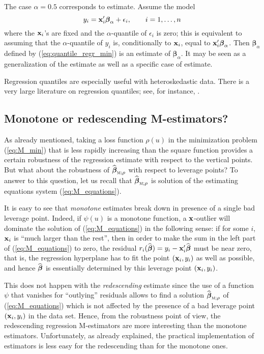 The case $\alpha=0.5$ corresponds to  estimate. Assume the model
\[
    y_{i} = \mathbf x_{i}' \boldsymbol\beta_{\alpha} + \epsilon_{i},
    \qquad i = 1, \dots, n
\]
where the $\mathbf x_{i}$'s are fixed and the $\alpha$-quantile of
$\epsilon_{i}$ is zero; this is equivalent to assuming that the
$\alpha$-quantile of $y_{i}$ is, conditionally to $\mathbf x_{i}$, equal to
$\mathbf x_{i}'\boldsymbol\beta_{\alpha}$. Then $\widehat
{\boldsymbol\beta}_{\alpha}$ defined by (\ref{eq:quantile_regr_min}) is an
estimate of $\boldsymbol\beta_{\alpha}$. It may be seen as a generalization of
the  estimate as well as a specific case of  estimate.

Regression quantiles are especially useful with heteroskedastic data. There is
a very large literature on regression quantiles; see, for instance,
\citet{Koenker:2005}.

\subsection{Monotone or redescending M-estimators?}

As already mentioned, taking a loss function $\rho(u)$ in the minimization
problem (\ref{eq:M_min}) that is less rapidly increasing than the square
function provides a certain robustness of the regression  estimate with
respect to the vertical points. But what about the robustness of
$\sthat{\boldsymbol\beta}_{\stsc{M};\rho}$ with respect to leverage points? To
answer to this question, let us recall that
$\sthat{\boldsymbol\beta}_{\stsc{M};\rho}$ is solution of the estimating
equations system (\ref{eq:M_equations}).

It is easy to see that \emph{monotone}  estimates break down in
presence of a single bad leverage point. Indeed, if $\psi(u)$ is a monotone
function, a $\mathbf x$-outlier will dominate the solution of
(\ref{eq:M_equations}) in the following sense: if for some $i$, $\mathbf x_{i}$
is “much larger than the rest”, then in order to make the sum in the left part
of (\ref{eq:M_equations}) to zero, the residual
$r_{i}(\widehat{\boldsymbol\beta}) = y_{i} -
\mathbf x_{i}'\widehat{\boldsymbol\beta}$ must be near zero, that is, the
regression hyperplane has to fit the point $(\mathbf x_{i}, y_{i})$ as well as
possible, and hence $\widehat{\boldsymbol\beta}$ is essentially determined by
this leverage point $(\mathbf x_{i}, y_{i})$.

This does not happen with the \emph{redescending}  estimate since the
use of a function $\psi$ that vanishes for “outlying” residuals allows to find
a solution $\widehat{\boldsymbol\beta}_{\stsc{M};\rho}$ of
(\ref{eq:M_equations}) which is not affected by the presence of a bad leverage
point $(\mathbf x_{i}, y_{i})$ in the data set. Hence, from the robustness
point of view, the redescending regression M-estimators are more interesting
than the monotone  estimators. Unfortunately, as already explained, the
practical implementation of  estimators is less easy for the
redescending than for the monotone ones.

